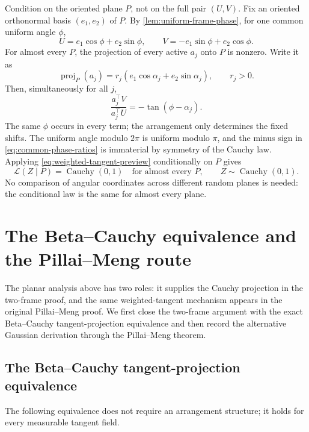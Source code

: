 \documentclass[11pt]{article}
\numberwithin{equation}{section}
\theoremstyle{thmstyleone}%
\theoremstyle{thmstyletwo}%
\let\cref\autoref
\newcommand{\Cauchy}{\operatorname{Cauchy}}
\newcommand{\Law}{\mathcal L}
\begin{document}
Condition on the oriented plane \(P\), not on the full pair \((U,V)\).  Fix
an oriented orthonormal basis \((e_1,e_2)\) of \(P\).  By
\cref{lem:uniform-frame-phase}, for one common uniform angle \(\phi\),
\begin{equation}
  U=e_1\cos\phi+e_2\sin\phi,
  \qquad
  V=-e_1\sin\phi+e_2\cos\phi.
  \label{eq:frame-parametrization}
\end{equation}
For almost every \(P\), the projection of every active \(a_j\) onto \(P\) is
nonzero.  Write it as
\[
  \operatorname{proj}_P(a_j)
  =r_j(e_1\cos\alpha_j+e_2\sin\alpha_j),
  \qquad r_j>0.
\]
Then, simultaneously for all \(j\),
\begin{equation}
  \frac{a_j^\top V}{a_j^\top U}
  =-\tan(\phi-\alpha_j).
  \label{eq:common-phase-ratios}
\end{equation}
The same \(\phi\) occurs in every term; the arrangement only determines the
fixed shifts.  The uniform angle modulo \(2\pi\) is uniform modulo \(\pi\),
and the minus sign in \cref{eq:common-phase-ratios} is immaterial by symmetry
of the Cauchy law.  Applying \cref{eq:weighted-tangent-preview} conditionally
on \(P\) gives
\begin{equation}
  \Law(Z\mid P)=\Cauchy(0,1)
  \quad\text{for almost every }P,
  \qquad
  Z\sim\Cauchy(0,1).
  \label{eq:Z-cauchy}
\end{equation}
No comparison of angular coordinates across different random planes is
needed: the conditional law is the same for almost every plane.

\section{The Beta--Cauchy equivalence and the Pillai--Meng route}
\label{sec:finite-law-deductions}

The planar analysis above has two roles: it supplies the Cauchy projection in
the two-frame proof, and the same weighted-tangent mechanism appears in the
original Pillai--Meng proof.  We first close the two-frame argument with the
exact Beta--Cauchy tangent-projection equivalence and then record the
alternative Gaussian derivation through the Pillai--Meng theorem.

\subsection{The Beta--Cauchy tangent-projection equivalence}
\label{sec:tangent-projection-converse}

The following equivalence does not require an arrangement structure; it
holds for every measurable tangent field.
\end{document}
